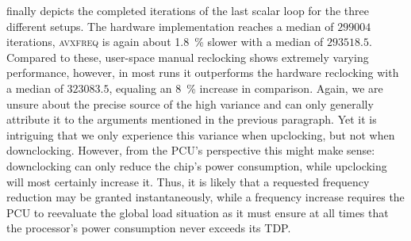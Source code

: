  finally depicts the completed iterations of the last scalar loop for the three different setups. The hardware implementation reaches a median of $299004$ iterations, \textsc{avxfreq} is again about \SI{1.8}{\percent} slower with a median of $293518.5$. Compared to these, user-space manual reclocking shows extremely varying performance, however, in most runs it outperforms the hardware reclocking with a median of $323083.5$, equaling an \SI{8}{\percent} increase in comparison. Again, we are unsure about the precise source of the high variance and can only generally attribute it to the arguments mentioned in the previous paragraph. Yet it is intriguing that we only experience this variance when upclocking, but not when downclocking. However, from the \gls{PCU}'s perspective this might make sense: downclocking can only reduce the chip's power consumption, while upclocking will most certainly increase it. Thus, it is likely that a requested frequency reduction may be granted instantaneously, while a frequency increase requires the \gls{PCU} to reevaluate the global load situation as it must ensure at all times that the processor's power consumption never exceeds its \gls{TDP}.